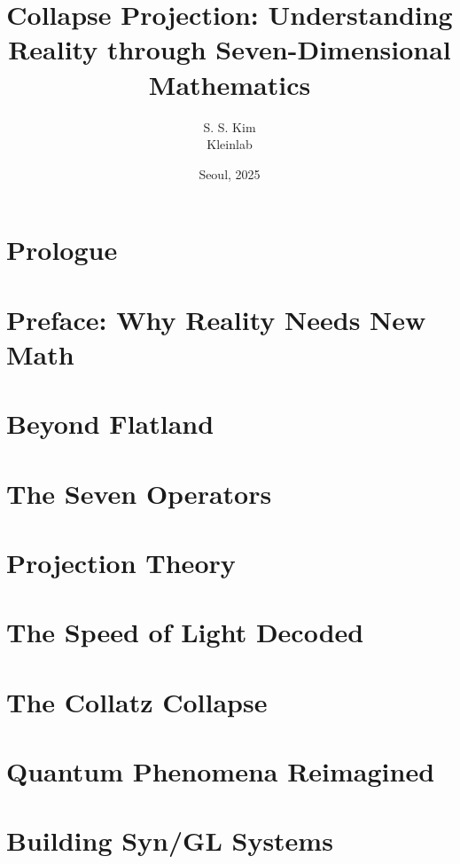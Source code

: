 \documentclass[11pt]{book}
\title{Collapse Projection: Understanding Reality through Seven-Dimensional Mathematics}
\author{S. S. Kim \\ Kleinlab}
\date{Seoul, 2025}
\begin{document}
\maketitle

\tableofcontents
\newpage

\chapter*{Prologue}


\chapter*{Preface: Why Reality Needs New Math}


\chapter{Beyond Flatland}


\chapter{The Seven Operators}


\chapter{Projection Theory}


\chapter{The Speed of Light Decoded}


\chapter{The Collatz Collapse}


\chapter{Quantum Phenomena Reimagined}


\chapter{Building Syn/GL Systems}

\end{document}
